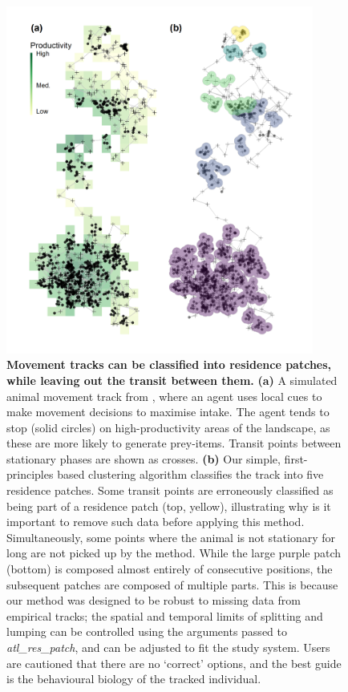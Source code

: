     \begin{figure}[ht!]
        \centering
        \includegraphics[width=0.9\textwidth]{figures/preprocessing/fig_06.png}
        \caption{
            \textbf{Movement tracks can be classified into residence patches, while leaving out the transit between them.}
            \textbf{(a)} A simulated animal movement track from \citealt{gupte2021a}, where an agent uses local cues to make movement decisions to maximise intake.
            The agent tends to stop (solid circles) on high-productivity areas of the landscape, as these are more likely to generate prey-items.
            Transit points between stationary phases are shown as crosses.
            \textbf{(b)} Our simple, first-principles based clustering algorithm classifies the track into five residence patches. 
            Some transit points are erroneously classified as being part of a residence patch (top, yellow), illustrating why is it important to remove such data before applying this method.
            Simultaneously, some points where the animal is not stationary for long are not picked up by the method.
            While the large purple patch (bottom) is composed almost entirely of consecutive positions, the subsequent patches are composed of multiple parts.
            This is because our method was designed to be robust to missing data from empirical tracks; the spatial and temporal limits of splitting and lumping can be controlled using the arguments passed to \textit{atl\_res\_patch}, and can be adjusted to fit the study system.
            Users are cautioned that there are no `correct' options, and the best guide is the behavioural biology of the tracked individual.
        }
        \label{preproc_fig_06}
    \end{figure}


